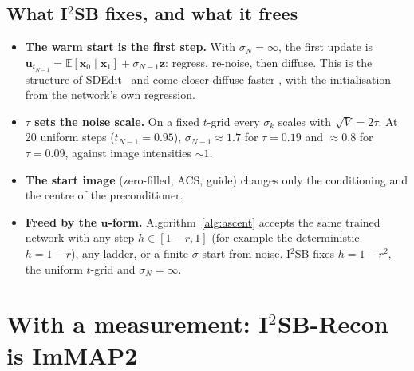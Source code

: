 \documentclass[11pt]{article}
\newcommand{\x}{\bm{x}}
\newcommand{\uu}{\bm{u}}
\newcommand{\zz}{\bm{z}}
\newcommand{\E}{\mathbb{E}}
\begin{document}
\subsection{What I\texorpdfstring{$^2$}{2}SB fixes, and what it frees}

\begin{itemize}[leftmargin=1.5em, itemsep=1pt]
  \item \textbf{The warm start is the first step.} With $\sigma_N=\infty$, the first update is
        $\uu_{t_{N-1}} = \E[\x_0\mid\x_1] + \sigma_{N-1}\zz$: regress, re-noise, then diffuse.
        This is the structure of SDEdit~\cite{meng2022} and come-closer-diffuse-faster
        \cite{chung2022}, with the initialisation from the network's own regression.
  \item \textbf{$\tau$ sets the noise scale.} On a fixed $t$-grid every $\sigma_k$ scales with
        $\sqrt V=2\tau$. At 20 uniform steps ($t_{N-1}=0.95$), $\sigma_{N-1}\approx1.7$ for
        $\tau=0.19$ and $\approx0.8$ for $\tau=0.09$, against image intensities $\sim1$.
  \item \textbf{The start image} (zero-filled, ACS, guide) changes only the conditioning and the
        centre of the preconditioner.
  \item \textbf{Freed by the $\uu$-form.} Algorithm~\ref{alg:ascent} accepts the same trained
        network with any step $h\in[1-r,1]$ (for example the deterministic $h=1-r$), any ladder,
        or a finite-$\sigma$ start from noise. I$^2$SB fixes $h=1-r^2$, the uniform $t$-grid and
        $\sigma_N=\infty$.
\end{itemize}

\section{With a measurement: I\texorpdfstring{$^2$}{2}SB-Recon is ImMAP2}
\end{document}
